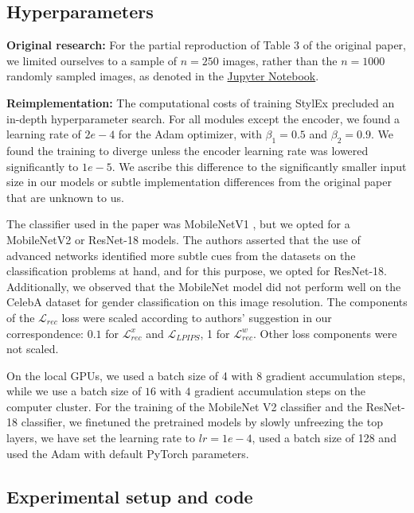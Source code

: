 \subsection{Hyperparameters}

\textbf{Original research:} For the partial reproduction of Table 3 of the original paper, we limited ourselves to a sample of $n=250$ images, rather than the $n=1000$ randomly sampled images, as denoted in the \href{https://github.com/google/explaining-in-style}{Jupyter Notebook}.

\textbf{Reimplementation:} The computational costs of training StylEx precluded an in-depth hyperparameter search. For all modules except the encoder, we found a learning rate of $2e-4$ for the Adam optimizer, with $\beta_1 = 0.5$ and $\beta_2 = 0.9$. We found the training to diverge unless the encoder learning rate was lowered significantly to  $1e-5$. We ascribe this difference to the significantly smaller input size in our models or subtle implementation differences from the original paper that are unknown to us.

The classifier used in the paper was MobileNetV1 \cite{howard2017mobilenets}, but we opted for a MobileNetV2 \cite{sandler2019mobilenetv2} or ResNet-18 models\cite{7780459}. The authors asserted that the use of advanced networks identified more subtle cues from the datasets on the classification problems at hand, and for this purpose, we opted for ResNet-18. Additionally, we observed that the MobileNet model did not perform well on the CelebA dataset for gender classification on this image resolution. The components of the $\mathcal{L}_{rec}$ loss were scaled according to authors' suggestion in our correspondence: $0.1$ for $\mathcal{L}_{rec}^x$ and $\mathcal{L}_{LPIPS}$, 1 for $ \mathcal{L}_{rec}^w$. Other loss components were not scaled.

On the local GPUs, we used a batch size of 4 with 8 gradient accumulation steps, while we use a batch size of $16$ with $4$ gradient accumulation steps on the computer cluster. For the training of the MobileNet V2 classifier and the ResNet-18 classifier, we finetuned the pretrained models by slowly unfreezing the top layers, we have set the learning rate to $lr = 1e-4$, used a batch size of 128 and used the Adam \cite{kingma2017adam} with default PyTorch parameters.


\subsection{Experimental setup and code}

